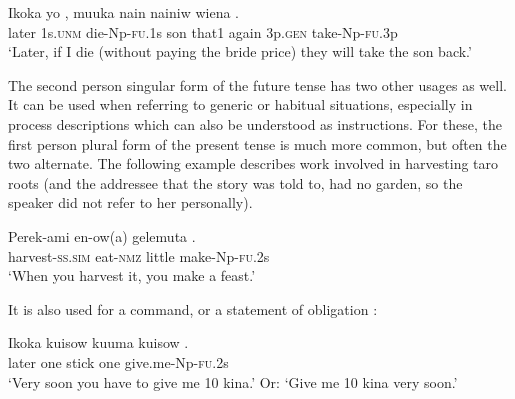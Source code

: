 \ea%
\label{ex:3:x1641}
\gll Ikoka yo , muuka nain nainiw wiena .\\
later 1s.\textsc{unm} die-Np-\textsc{fu}.1s son that1 again 3p.\textsc{gen}  take-Np-\textsc{fu}.3p\\
\glt`Later, if I die (without paying the bride price) they will take the son back.'
\z

The second person singular form of the future tense has two other usages as well. It can be used when referring to generic or habitual situations, especially in process descriptions which can also be understood as instructions. For these, the first person plural form of the present tense is much more common, but often the two alternate. The following example  describes work involved in harvesting taro roots (and the addressee that the story was told to, had no garden, so the speaker did not refer to her personally). 

\ea%
\label{ex:3:x1038}
\gll Perek-ami en-ow(a) gelemuta . \\
harvest-\textsc{ss}.\textsc{sim} eat-\textsc{nmz} little make-Np-\textsc{fu}.2s\\
\glt`When you harvest it, you make a feast.'
\z

It is also used for a command, or a statement of obligation :

\ea%
\label{ex:3:x1039}
\gll Ikoka kuisow kuuma kuisow . \\
later one stick one give.me-Np-\textsc{fu}.2s\\
\glt`Very soon you have to give me 10 kina.' Or: `Give me 10 kina very soon.'
\z

